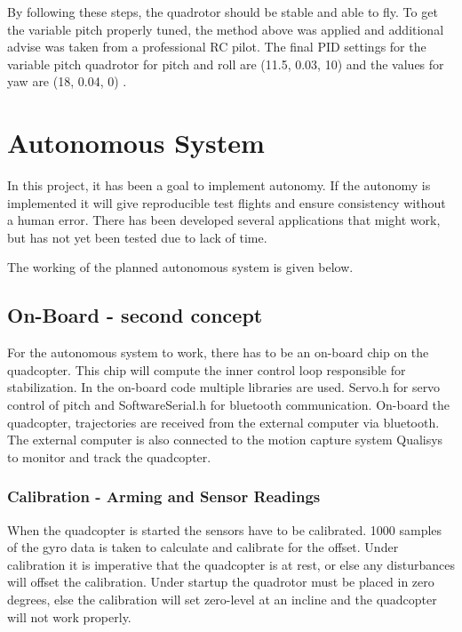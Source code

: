 By following these steps, the quadrotor should be stable and able to fly. To get the variable pitch properly tuned, the method above was applied and additional advise was taken from a professional RC pilot. The final PID settings for the variable pitch quadrotor for pitch and roll are (11.5, 0.03, 10) and the values for yaw are (18, 0.04, 0) \cite{PID-tune}.
\clearpage



\clearpage   %



\newpage
\chapter{Autonomous System}

In this project, it has been a goal to implement autonomy. If the autonomy is implemented it will give reproducible test flights and ensure consistency without a human error.  There has been developed several applications that might work, but has not yet been tested due to lack of time. \bigskip

The working of the planned autonomous system is given below.

\section{On-Board - second concept}

For the autonomous system to work, there has to be an on-board chip on the quadcopter. This chip will compute the inner control loop responsible for stabilization. In the on-board code multiple libraries are used. Servo.h for servo control of pitch and SoftwareSerial.h for bluetooth communication. On-board the quadcopter, trajectories are received from the external computer via bluetooth. The external computer is also connected to the motion capture system Qualisys to monitor and track the quadcopter.


\subsection{Calibration - Arming and Sensor Readings}

When the quadcopter is started the sensors have to be calibrated. 1000 samples of the gyro data is taken to calculate and calibrate for the offset. Under calibration it is imperative that the quadcopter is at rest, or else any disturbances will offset the calibration. Under startup the quadrotor must be placed in zero degrees, else the calibration will set zero-level at an incline and the quadcopter will not work properly.\bigskip

